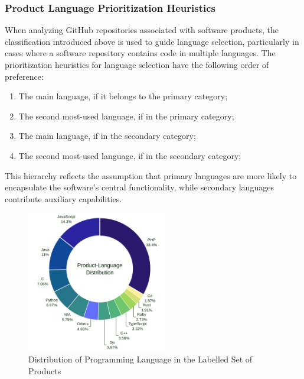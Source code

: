 \subsubsection{Product Language Prioritization Heuristics}
When analyzing GitHub repositories associated with software products, the classification introduced above is used to guide language selection, particularly in cases where a software repository contains code in multiple languages. The prioritization heuristics for language selection have the following order of preference:

\begin{enumerate}
    \item The main language, if it belongs to the primary category;
    \item The second most-used language, if in the primary category;
    \item The main language, if in the secondary category;
    \item The second most-used language, if in the secondary category;
\end{enumerate}

This hierarchy reflects the assumption that primary languages are more likely to encapsulate the software's central functionality, while secondary languages contribute auxiliary capabilities. 

\begin{figure}[!h]
	\centering
    \includegraphics[width=0.55\textwidth]{figures/chapter_2/product_language_distribution_donut.png}
	\caption{Distribution of Programming Language in the Labelled Set of Products}
	\label{fig:product_language_distribution}
\end{figure}

